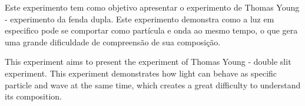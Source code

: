%
%
%
Este experimento tem como objetivo apresentar o experimento de Thomas Young - experimento da fenda dupla. Este experimento demonstra como a luz em especifico pode se comportar como partícula e onda ao mesmo tempo, o que gera uma grande dificuldade de compreensão de sua composição.

%

This experiment aims to present the experiment of Thomas Young - double slit experiment. This experiment demonstrates how light can behave as specific particle and wave at the same time, which creates a great difficulty to understand its composition.
